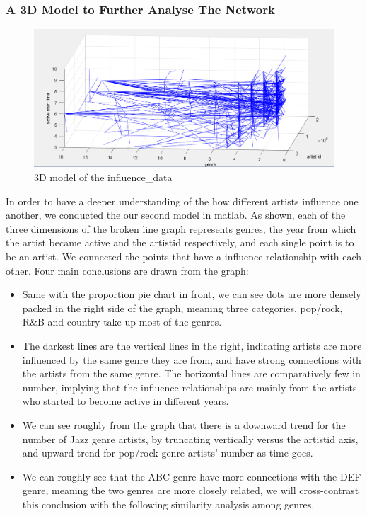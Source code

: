 \documentclass[12pt]{article}
\begin{document}
\subsubsection{A 3D Model to Further Analyse The Network}\quad \;
\begin{figure}[h]
\small
\centering
\includegraphics[width=14cm]{3D.png}
\caption{3D model of the influence\_data}
\end{figure}
In order to have a deeper understanding of the how different artists influence one another, we conducted the our second model in matlab. As shown, each of the three dimensions of the broken line graph represents genres, the year from which the artist became active and the artist\-id respectively, and each single point is to be an artist. We connected the points that have a influence relationship with each other. 
Four main conclusions are drawn from the graph:
\begin{itemize}
\item Same with the proportion pie chart in front, we can see dots are more densely packed in the right side of the graph, meaning three categories, pop/rock, R\&B and country take up most of the genres.
\item The darkest lines are the vertical lines in the right, indicating artists are more influenced by the same genre they are from, and have strong connections with the artists from the same genre. The horizontal lines are comparatively few in number, implying that the influence relationships are mainly from the artists who started to become active in different years.
\item We can see roughly from the graph that there is a downward trend for the number of Jazz genre artists, by truncating vertically versus the artist\-id axis, and upward trend for pop/rock genre artists' number as time goes.
\item We can roughly see that the ABC genre have more connections with the DEF genre, meaning the two genres are more closely related, we will cross-contrast this conclusion with the following similarity analysis among genres.
\end{itemize}
\end{document}

